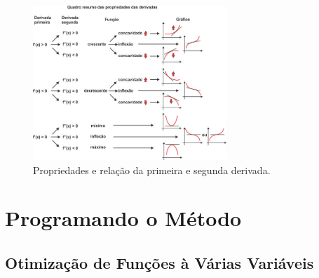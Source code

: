 \begin{figure}[h]
    \includegraphics[width=0.65\textwidth]
        {src/relacao_primeira_segunda_derivada.jpg}
    \centering
    \caption{Propriedades e relação da primeira e segunda derivada.}
    \label{relacao_primeira_segunda_derivada}
\end{figure}


\section{{Programando o Método}}

\hspace{0.8cm}


\textcolor[rgb]{1,0,0}{\section{{Otimização de Funções à Várias Variáveis}}}

\hspace{0.8cm}





%
